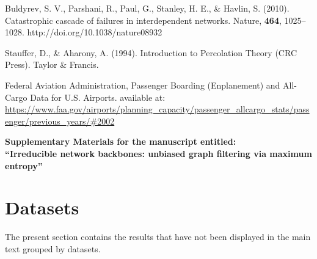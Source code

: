 \documentclass[aps,twocolumn,superscriptaddress]{revtex4-1}
\begin{document}
\begin{thebibliography}{99}
 Buldyrev, S. V., Parshani, R., Paul, G., Stanley, H. E., \& Havlin, S. (2010). Catastrophic cascade of failures in interdependent networks. Nature, {\bf 464}, 1025--1028. http://doi.org/10.1038/nature08932



 Stauffer, D., \& Aharony, A. (1994). Introduction to Percolation Theory (CRC Press). Taylor \& Francis.


 Federal Aviation Administration, Passenger Boarding (Enplanement) and All-Cargo Data for U.S. Airports. available at: \url{https://www.faa.gov/airports/planning_capacity/passenger_allcargo_stats/passenger/previous_years/#2002}


\end{thebibliography}




%
%

\pagebreak
\widetext
\begin{center}
\textbf{\large Supplementary Materials for the manuscript entitled: \\``Irreducible network backbones: unbiased graph filtering via maximum entropy''}
\end{center}
\setcounter{equation}{0}
\setcounter{figure}{0}
\setcounter{table}{0}
\setcounter{page}{1}
\setcounter{section}{0}
\makeatletter
\renewcommand{\thetable}{TS\arabic{table}}
\renewcommand{\thefigure}{S\arabic{figure}}
\renewcommand{\thesection}{S\Roman{section}} 
\renewcommand{\thesubsection}{\thesection.\roman{subsection}}

\renewcommand{\arraystretch}{1.15}



\section{Datasets}

The present section contains the results that have not been displayed in the main text grouped by datasets.
\end{document}
